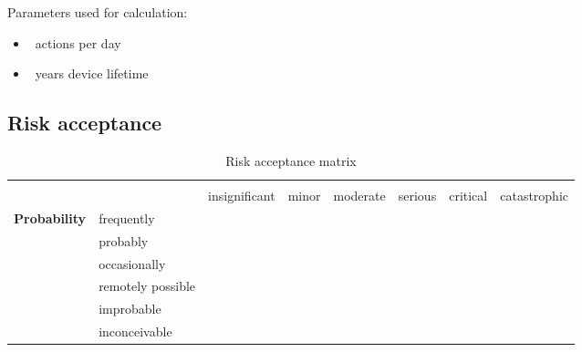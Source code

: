\documentclass{../../git_submodules/common_docu/doc_class}
\begin{document}
Parameters used for calculation:
\begin{itemize}
  \item \NumActionsPerDay~actions per day
  \item \NumYearsLifeTime~years device lifetime
\end{itemize}

\subsection{Risk acceptance}

\begin{table}[H]
  \begin{tabular}{l>{\small}l|c|c|c|c|c|c|}
    \cline{3-8}
    \multicolumn{2}{l|}{\multirow{2}{*}{}} & \multicolumn{6}{c|}{\textbf{Severity}} \\ %
    \multicolumn{2}{l|}{} & \small{insignificant} &\small{ minor} & \small{moderate} & \small{serious} & \small{critical} & \small{catastrophic} \\ \hline
    \multicolumn{1}{|c}{\multirow{6}{*}{\textbf{Probability}}} & frequently & 
    \cellcolor{colorRiskRed} & \cellcolor{colorRiskRed} & \cellcolor{colorRiskRed} & \cellcolor{colorRiskRed} & \cellcolor{colorRiskRed} & \cellcolor{colorRiskRed} \\ \hhline{|~-------}
    \multicolumn{1}{|l}{} & probably & 
    \cellcolor{colorRiskYellow} & \cellcolor{colorRiskRed} & \cellcolor{colorRiskRed} & \cellcolor{colorRiskRed} & \cellcolor{colorRiskRed} & \cellcolor{colorRiskRed} \\ \hhline{|~-------}
    \multicolumn{1}{|l}{} & occasionally & 
    \cellcolor{colorRiskYellow} & \cellcolor{colorRiskYellow} & \cellcolor{colorRiskRed} & \cellcolor{colorRiskRed} & \cellcolor{colorRiskRed} & \cellcolor{colorRiskRed} \\ \hhline{|~-------}
    \multicolumn{1}{|l}{} & remotely possible & 
    \cellcolor{colorRiskYellow} & \cellcolor{colorRiskYellow} & \cellcolor{colorRiskYellow} & \cellcolor{colorRiskRed} & \cellcolor{colorRiskRed} & \cellcolor{colorRiskRed} \\ \hhline{|~-------}
    \multicolumn{1}{|l}{} & improbable & 
    \cellcolor{colorRiskYellow} & \cellcolor{colorRiskYellow} & \cellcolor{colorRiskYellow} & \cellcolor{colorRiskYellow} & \cellcolor{colorRiskRed} & \cellcolor{colorRiskRed} \\ \hhline{|~-------}
    \multicolumn{1}{|l}{} & inconceivable & 
    \cellcolor{colorRiskYellow} & \cellcolor{colorRiskYellow} & \cellcolor{colorRiskYellow} & \cellcolor{colorRiskYellow} & \cellcolor{colorRiskYellow} & \cellcolor{colorRiskRed} \\ \hline
  \end{tabular}
  \caption{Risk acceptance matrix}
\end{table}
\end{document}
